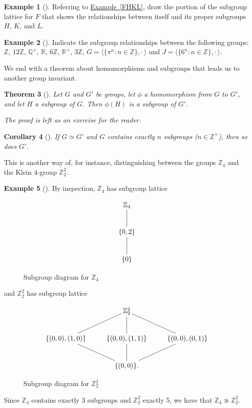 \documentclass[10pt,]{book}
\theoremstyle{plain}
\newtheorem{theorem}{Theorem}[section]
\newtheorem{corollary}[theorem]{Corollary}
\theoremstyle{definition}
\theoremstyle{definition}
\theoremstyle{definition}
\newtheorem{example}[theorem]{Example}
\theoremstyle{definition}
\numberwithin{equation}{section}
\def\Z{\mathbb{Z}}
\def\R{\mathbb{R}}
\def\Q{\mathbb{Q}}
\begin{document}
\begin{example}[]\label{example-39}
Referring to \hyperref[FHKL]{Example~\ref{FHKL}}, draw the portion of the subgroup lattice for \(F\) that shows the relationships between itself and its proper subgroups \(H\), \(K\), and \(L\).%
\end{example}
\begin{example}[]\label{example-40}
Indicate the subgroup relationships between the following groups: \(\Z\), \(12\Z\), \(\Q^+\), \(\R\), \(6\Z\), \(\R^+\), \(3\Z\), \(G=\langle \{\pi^n:n\in \Z\},\cdot\,\rangle\) and \(J=\langle \{6^n:n\in \Z\},\cdot\,\rangle .\)%
\end{example}
We end with a theorem about homomorphisms and subgroups that leads us to another group invariant.%
\begin{theorem}[{}]\label{imsubgp}
Let \(G\) and \(G'\) be groups, let \(\phi\) a homomorphism from \(G\) to \(G'\), and let \(H\) a subgroup of \(G\). Then \(\phi(H)\) is a subgroup of \(G'\).%
\par
\emph{The proof is left as an exercise for the reader.}%
\end{theorem}
\begin{corollary}[{}]\label{corollary-3}
If \(G\simeq G'\) and \(G\) contains exactly \(n\) subgroups (\(n\in \Z^+\)), then so does \(G'\).%
\end{corollary}
This is another way of, for instance, distinguishing between the groups \(\Z_4\) and the Klein 4-group \(\Z_2^2\).%
\begin{example}[]\label{example-41}
By inspection, \(\Z_4\) has subgroup lattice \begin{figure}
\centering
{
\[\xymatrix{\Z_4 \ar@{-}[d]\\ \{0,2\}\ar@{-}[d]\\ \{0\}} \]
}
\caption{Subgroup diagram for \(\Z_4\)\label{figure-4}}
\end{figure}
 and \(\Z_2^2\) has subgroup lattice \begin{figure}
\centering
{
\[\xymatrix{&\Z_2^2 \ar@{-}[dl]\ar@{-}[d]\ar@{-}[dr]&\\ \{(0,0),(1,0)\}\ar@{-}[dr]&\{(0,0),(1,1)\}\ar@{-}[d]&\{(0,0),(0,1)\}\ar@{-}[dl]\\ &\{(0,0)\}. &}\]
}
\caption{Subgroup diagram for \(\Z_2^2\)\label{figure-5}}
\end{figure}
%
\par
Since \(\Z_4\) contains exactly 3 subgroups and \(\Z_2^2\) exactly 5, we have that \(\Z_4\not\simeq \Z_2^2\).%
\end{example}
\typeout{************************************************}
\typeout{************************************************}
\end{document}
